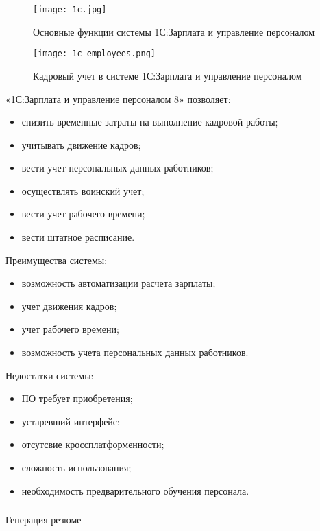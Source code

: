\begin{figure}[!h]
	\centering
	\texttt{[image: 1c.jpg]} 
	\caption{Основные функции системы 1С:Зарплата и управление персоналом}
	\label{fig:analysis:analogues:1c}
\end{figure}

\begin{figure}[!h]
	\centering
	\texttt{[image: 1c\_employees.png]} 
	\caption{Кадровый учет в системе 1С:Зарплата и управление персоналом}
	\label{fig:analysis:analogues:1c_employees}
\end{figure}

«1С:Зарплата и управление персоналом 8» позволяет:
\begin{itemize}
	\item снизить временные затраты на выполнение кадровой работы;
	\item учитывать движение кадров;
	\item вести учет персональных данных работников;
	\item осуществлять воинский учет;
	\item вести учет рабочего времени;
	\item вести штатное расписание.
\end{itemize}

Преимущества системы:
\begin{itemize}
	\item возможность автоматизации расчета зарплаты;
	\item учет движения кадров;
	\item учет рабочего времени;
	\item возможность учета персональных данных работников.
\end{itemize}

Недостатки системы:
\begin{itemize}
	\item ПО требует приобретения;
	\item устаревший интерфейс;
	\item отсутсвие кроссплатформенности;
	\item сложность использования;
	\item необходимость предварительного обучения персонала.
\end{itemize}
\pagebreak

\subsubsection{} Генерация резюме
\label{sec:analysis:analogues:generation}

